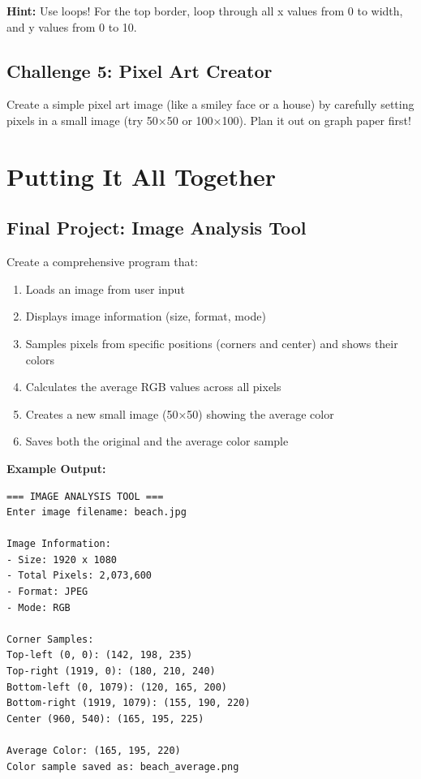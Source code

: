 \documentclass[11pt]{article}
\begin{document}
\textbf{Hint:} Use loops! For the top border, loop through all x values from 0 to width, and y values from 0 to 10.

\subsection*{Challenge 5: Pixel Art Creator}

Create a simple pixel art image (like a smiley face or a house) by carefully setting pixels in a small image (try 50×50 or 100×100). Plan it out on graph paper first!

\section{Putting It All Together}

\subsection*{Final Project: Image Analysis Tool}

Create a comprehensive program that:

\begin{enumerate}
    \item Loads an image from user input
    \item Displays image information (size, format, mode)
    \item Samples pixels from specific positions (corners and center) and shows their colors
    \item Calculates the average RGB values across all pixels
    \item Creates a new small image (50×50) showing the average color
    \item Saves both the original and the average color sample
\end{enumerate}

\textbf{Example Output:}
\begin{verbatim}
=== IMAGE ANALYSIS TOOL ===
Enter image filename: beach.jpg

Image Information:
- Size: 1920 x 1080
- Total Pixels: 2,073,600
- Format: JPEG
- Mode: RGB

Corner Samples:
Top-left (0, 0): (142, 198, 235)
Top-right (1919, 0): (180, 210, 240)
Bottom-left (0, 1079): (120, 165, 200)
Bottom-right (1919, 1079): (155, 190, 220)
Center (960, 540): (165, 195, 225)

Average Color: (165, 195, 220)
Color sample saved as: beach_average.png
\end{verbatim}
\end{document}
